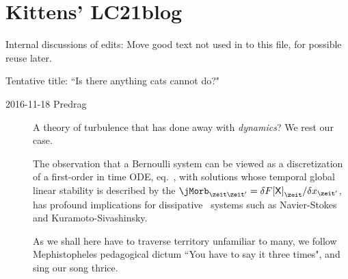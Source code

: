 
\section{Kittens' LC21blog}
\label{s:CL18blog}

Internal discussions of  edits:
Move good text not used in  to this file, for possible
reuse later.

\bigskip

Tentative title:    ``Is there anything cats cannot do?"

\begin{description}

\item[2016-11-18 Predrag]
A theory of turbulence that has done away with \emph{dynamics}?
We rest our case.

The observation that a Bernoulli system can be viewed as a discretization
of a first-order in time ODE, eq.~, with solutions
whose temporal global linear stability is described by the {\jacobianOrb}
$\jMorb_{\zeit\zeit'}=\delta{F[\Xx]}_{\zeit}/\delta\ssp_{\zeit'}$, has
profound implications for dissipative \spt\ systems such as Navier-Stokes
and Kuramoto-Sivashinsky.

As we shall here have to traverse territory unfamiliar to many, we
follow Mephistopheles pedagogical dictum ``You have to say it three
times", and sing our song thrice.



\end{description}
